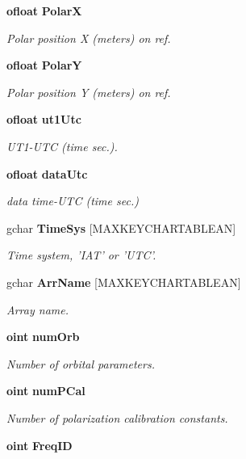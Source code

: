 \begin{CompactItemize}
{\bf ofloat} {\bf Polar\-X}
\begin{CompactList}\small\item\em Polar position X (meters) on ref. \item\end{CompactList}\item 
{\bf ofloat} {\bf Polar\-Y}
\begin{CompactList}\small\item\em Polar position Y (meters) on ref. \item\end{CompactList}\item 
{\bf ofloat} {\bf ut1Utc}
\begin{CompactList}\small\item\em UT1-UTC (time sec.). \item\end{CompactList}\item 
{\bf ofloat} {\bf data\-Utc}
\begin{CompactList}\small\item\em data time-UTC (time sec.) \item\end{CompactList}\item 
gchar {\bf Time\-Sys} [MAXKEYCHARTABLEAN]
\begin{CompactList}\small\item\em Time system, 'IAT' or 'UTC'. \item\end{CompactList}\item 
gchar {\bf Arr\-Name} [MAXKEYCHARTABLEAN]
\begin{CompactList}\small\item\em Array name. \item\end{CompactList}\item 
{\bf oint} {\bf num\-Orb}
\begin{CompactList}\small\item\em Number of orbital parameters. \item\end{CompactList}\item 
{\bf oint} {\bf num\-PCal}
\begin{CompactList}\small\item\em Number of polarization calibration constants. \item\end{CompactList}\item 
{\bf oint} {\bf Freq\-ID}

\end{CompactItemize}
